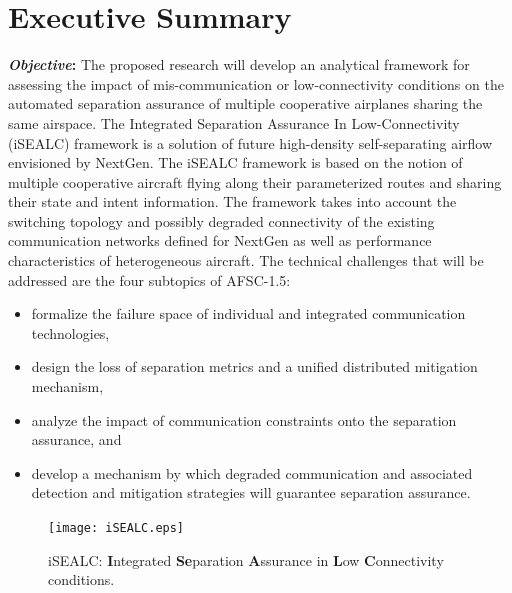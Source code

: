 \documentclass[letter,onecolumn,12pt]{aiaa-tc}
\newcommand{\1}{1_n}
\begin{document}
\pagestyle{empty}
\section*{Executive Summary}  %
\textbf{\emph{Objective}:} The proposed research will develop an analytical framework for assessing the impact
of mis-communication or low-connectivity conditions on the automated separation assurance of multiple cooperative
airplanes sharing the same airspace. The Integrated Separation Assurance In Low-Connectivity (iSEALC) framework
is a solution of future high-density self-separating airflow envisioned by NextGen. The iSEALC framework is based on
the notion of  multiple cooperative aircraft flying along their parameterized routes and sharing their state
and intent information. The framework takes into account the switching topology and possibly degraded connectivity
of the existing communication networks defined for NextGen as well as performance characteristics of heterogeneous aircraft.
The technical challenges that will be addressed are the four subtopics of AFSC-1.5:
\vspace{-4mm}
\begin{itemize}
\setlength{\itemsep}{-4pt}
    \item formalize the failure space of individual and integrated communication technologies,
    \item design the loss of separation metrics and a unified distributed mitigation mechanism,
    \item analyze the impact of  communication constraints onto the separation assurance, and
    \item develop a mechanism by which degraded communication and associated detection and mitigation strategies will guarantee separation assurance.
\end{itemize}
\vspace{-2mm}
\begin{figure}
\centering
\vspace{-0mm}
\texttt{[image: iSEALC.eps]}
\caption*{\footnotesize iSEALC: \textbf{I}ntegrated \textbf{Se}paration \textbf{A}ssurance in \textbf{L}ow \textbf{C}onnectivity conditions.}
\label{fig:ISEALC}
\end{figure}
\vspace{-1mm}
\end{document}
